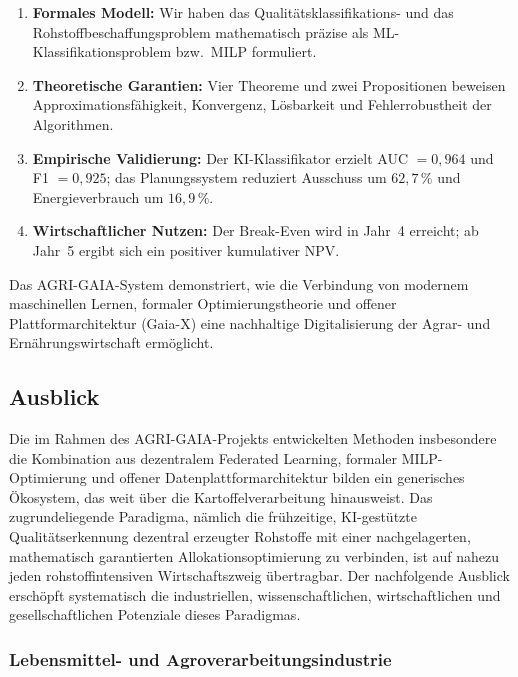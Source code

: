 \documentclass[a4paper, 12pt, twoside, openright]{report}
\theoremstyle{definition}
\theoremstyle{definition}
\begin{document}
\begin{enumerate}
	\item \textbf{Formales Modell:} Wir haben das Qualitätsklassifikations-
	und das Rohstoffbeschaffungsproblem mathematisch präzise als
	ML-Klassifikationsproblem bzw.\ MILP formuliert.
	\item \textbf{Theoretische Garantien:} Vier Theoreme und zwei Propositionen
	beweisen Approximationsfähigkeit, Konvergenz, Lösbarkeit und
	Fehlerrobustheit der Algorithmen.
	\item \textbf{Empirische Validierung:} Der KI-Klassifikator erzielt
	AUC $= 0{,}964$ und F1 $= 0{,}925$; das Planungssystem reduziert
	Ausschuss um $62{,}7\,\%$ und Energieverbrauch um $16{,}9\,\%$.
	\item \textbf{Wirtschaftlicher Nutzen:} Der Break-Even wird in Jahr~4
	erreicht; ab Jahr~5 ergibt sich ein positiver kumulativer NPV.
\end{enumerate}

Das AGRI-GAIA-System demonstriert, wie die Verbindung von modernem
maschinellen Lernen, formaler Optimierungstheorie und offener
Plattformarchitektur (Gaia-X) eine nachhaltige Digitalisierung der
Agrar- und Ernährungswirtschaft ermöglicht.

\subsection{Ausblick}

Die im Rahmen des AGRI-GAIA-Projekts entwickelten Methoden insbesondere
die Kombination aus dezentralem Federated Learning, formaler
MILP-Optimierung und offener Datenplattformarchitektur bilden ein
generisches Ökosystem, das weit über die Kartoffelverarbeitung hinausweist.
Das zugrundeliegende Paradigma, nämlich die frühzeitige, KI-gestützte
Qualitätserkennung dezentral erzeugter Rohstoffe mit einer nachgelagerten,
mathematisch garantierten Allokationsoptimierung zu verbinden, ist auf
nahezu jeden rohstoffintensiven Wirtschaftszweig übertragbar. Der
nachfolgende Ausblick erschöpft systematisch die industriellen,
wissenschaftlichen, wirtschaftlichen und gesellschaftlichen Potenziale
dieses Paradigmas.

\subsubsection{Lebensmittel- und Agroverarbeitungsindustrie}
\end{document}
